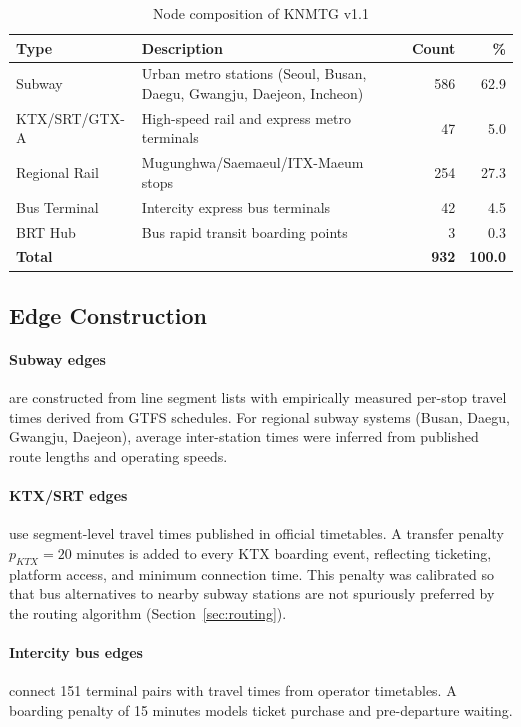 \documentclass[12pt]{article}
\begin{document}
\begin{table}[h]
\centering
\caption{Node composition of KNMTG v1.1}
\label{tab:nodes}
\begin{tabular}{lp{6.5cm}rr}
\toprule
Type & Description & Count & \% \\
\midrule
Subway & Urban metro stations (Seoul, Busan, Daegu, Gwangju, Daejeon, Incheon) & 586 & 62.9 \\
KTX/SRT/GTX-A & High-speed rail and express metro terminals & 47 & 5.0 \\
Regional Rail & Mugunghwa/Saemaeul/ITX-Maeum stops & 254 & 27.3 \\
Bus Terminal & Intercity express bus terminals & 42 & 4.5 \\
BRT Hub & Bus rapid transit boarding points & 3 & 0.3 \\
\midrule
\textbf{Total} & & \textbf{932} & \textbf{100.0} \\
\bottomrule
\end{tabular}
\end{table}

\subsection{Edge Construction}

\paragraph{Subway edges} are constructed from line segment lists with
empirically measured per-stop travel times derived from GTFS schedules.
For regional subway systems (Busan, Daegu, Gwangju, Daejeon), average
inter-station times were inferred from published route lengths and
operating speeds.

\paragraph{KTX/SRT edges} use segment-level travel times published in
official timetables. A transfer penalty $p_{KTX} = 20$ minutes is
added to every KTX boarding event, reflecting ticketing, platform
access, and minimum connection time. This penalty was calibrated so
that bus alternatives to nearby subway stations are not spuriously
preferred by the routing algorithm (Section~\ref{sec:routing}).

\paragraph{Intercity bus edges} connect 151 terminal pairs with travel
times from operator timetables. A boarding penalty of 15 minutes
models ticket purchase and pre-departure waiting.
\end{document}
